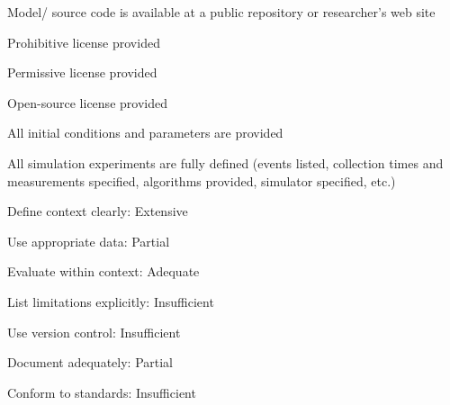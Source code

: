 \documentclass{article}
\newcommand{\absent}{\raisebox{0pt}{\tikz{\node[draw,scale=0.7,regular polygon, regular polygon sides=4,fill=none](){};}}}
\newcommand{\present}{\raisebox{0pt}{\tikz{\node[draw,scale=0.7,regular polygon, regular polygon sides=4,fill=black!20!Cerulean](){};}}}
\begin{document}
\begin{tcolorbox}[
colback=white,
arc=0pt,
outer arc=0pt,
colframe=white,
top=2mm,
toptitle=2mm,
bottomtitle=2mm,
colbacktitle=white!80!black,
colframe=black,
coltitle=black, 
title= \textbf{Box 2:} Criteria for accessibility]

\begin{todolist}
  \item[\absent] Model/ source code is available at a public repository or researcher's web site
  \begin{todolist}
    \item Prohibitive license provided
    \item[\absent] Permissive license provided
    \item Open-source license provided
  \end{todolist}
  \item[\absent] All initial conditions and parameters are provided
  \item[\absent] All simulation experiments are fully defined (events listed, collection times and measurements specified, algorithms provided, simulator specified, etc.)
\end{todolist}
\end{tcolorbox}


\begin{tcolorbox}[
colback=white,
arc=0pt,
outer arc=0pt,
colframe=white,
top=2mm,
toptitle=2mm,
bottomtitle=2mm,
colbacktitle=white!80!black,
colframe=black,
coltitle=black, 
title= \textbf{Box 3:} Rules for Credible practice of
 Modeling and Simulation\footnote{Model credibility is assessed using the Interagency Modeling and Ananlysis Group conformance rubric:\\ \href{https://www.imagwiki.nibib.nih.gov/content/10-simple-rules-conformance-rubric}{https://www.imagwiki.nibib.nih.gov/content/10-simple-rules-conformance-rubric}}]
\begin{todolist}
    \item[\present]Define context clearly: Extensive
    \item[\present]Use appropriate data: Partial
    \item[\present]Evaluate within context: Adequate
    \item[\absent]List limitations explicitly: Insufficient
    \item[\absent]Use version control: Insufficient
    \item[\present]Document adequately: Partial
    \item[\absent]Conform to standards: Insufficient
\end{todolist}
\end{tcolorbox}
\end{document}
